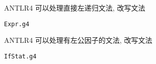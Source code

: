 \begin{frame}{}
  

  \pause
  \vspace{0.30cm}
  
\end{frame}

\begin{frame}{}
  \begin{center}
    ANTLR4 可以处理直接左递归文法, 改写文法

    \vspace{0.50cm}
    \texttt{Expr.g4}
  \end{center}
\end{frame}

\begin{frame}{}
  \begin{center}

    \vspace{0.50cm}
    \vspace{0.50cm}

  \end{center}
\end{frame}

\begin{frame}{}
  \begin{center}
    ANTLR4 可以处理有左公因子的文法, 改写文法

    \vspace{0.50cm}
    \texttt{IfStat.g4}
  \end{center}
\end{frame}
